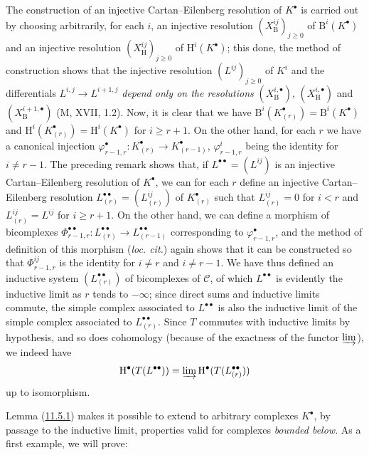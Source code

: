 The construction of an injective Cartan--Eilenberg resolution of $K^\bullet$
is carried out by choosing arbitrarily, for each $i$, an injective resolution
$(X_{\mathrm B}^{ij})_{j\geq0}$ of $\mathrm B^i(K^\bullet)$ and an injective
resolution $(X_{\mathrm H}^{ij})_{j\geq0}$ of
$\mathrm H^i(K^\bullet)$; this done, the method of construction shows that
the injective resolution $(L^{ij})_{j\geq0}$ of $K^i$ and the
differentials $L^{i,j}\to L^{i+1,j}$ \emph{depend only on the resolutions}
$(X_{\mathrm B}^{i,\bullet})$, $(X_{\mathrm H}^{i,\bullet})$ and
$(X_{\mathrm B}^{i+1,\bullet})$ (M, XVII, 1.2). Now, it is clear that we have
$\mathrm B^i(K_{(r)}^\bullet)=\mathrm B^i(K^\bullet)$ and
$\mathrm H^i(K_{(r)}^\bullet)=\mathrm H^i(K^\bullet)$ for $i\geq r+1$. On
the other hand, for each $r$ we have a canonical injection
$\varphi_{r-1,r}^\bullet:K_{(r)}^\bullet\to K_{(r-1)}^\bullet$,
$\varphi_{r-1,r}^i$ being the identity for $i\neq r-1$. The preceding remark
shows that, if $L^{\bullet\bullet}=(L^{ij})$ is an injective
Cartan--Eilenberg resolution of $K^\bullet$, we can for each $r$ define an
injective Cartan--Eilenberg resolution
$L_{(r)}^{\bullet\bullet}=(L_{(r)}^{ij})$ of $K_{(r)}^\bullet$ such that
$L_{(r)}^{ij}=0$ for $i<r$ and $L_{(r)}^{ij}=L^{ij}$ for $i\geq r+1$. On the
other hand, we can define a morphism of bicomplexes
$\Phi_{r-1,r}^{\bullet\bullet}:L_{(r)}^{\bullet\bullet}\to
L_{(r-1)}^{\bullet\bullet}$ corresponding to $\varphi_{r-1,r}^\bullet$, and the
method of definition of this morphism (\emph{loc. cit.}) again shows that it
can be constructed so that $\Phi_{r-1,r}^{ij}$ is the identity for
$i\neq r$ and $i\neq r-1$. We have thus defined an inductive system
$(L_{(r)}^{\bullet\bullet})$ of bicomplexes of $\mathcal C$, of which
$L^{\bullet\bullet}$ is evidently the inductive limit as $r$ tends to
$-\infty$; since direct sums and inductive limits commute, the simple
complex associated to $L^{\bullet\bullet}$ is also the inductive limit
of the simple complex associated to $L_{(r)}^{\bullet\bullet}$. Since $T$
commutes with inductive limits by hypothesis, and so does
cohomology (because of the exactness of the functor $\varinjlim$), we indeed have
\[
  \mathrm H^\bullet(T(L^{\bullet\bullet}))=
  \varinjlim\mathrm H^\bullet(T(L_{(r)}^{\bullet\bullet}))
\]
up to isomorphism.

Lemma (\hyperref[0.11.5.1]{11.5.1}) makes it possible to extend to arbitrary complexes
$K^\bullet$, by passage to the inductive limit, properties
valid for complexes \emph{bounded below}. As a first
example, we will prove:

